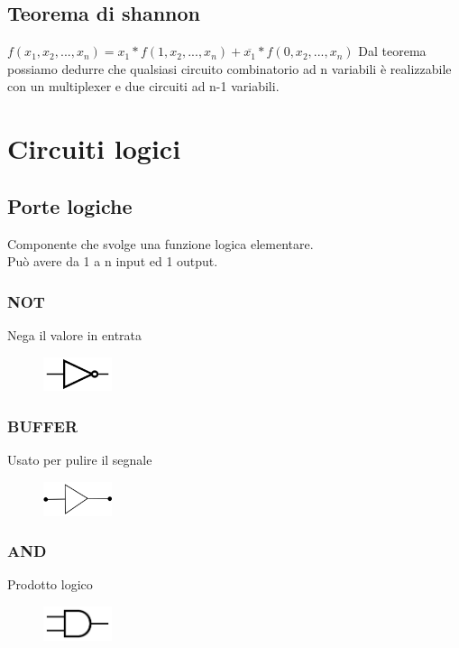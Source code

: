 \documentclass{report}
\newcommand{\n}[1]{\overline{#1}}
\begin{document}
    \subsection{Teorema di shannon}
        $f(x_1, x_2, ..., x_n) = x_1 * f(1, x_2, ..., x_n) + \n{x_1} * f(0, x_2, ..., x_n)$
        Dal teorema possiamo dedurre che qualsiasi circuito combinatorio ad n variabili 
        è realizzabile con un multiplexer e due circuiti ad n-1 variabili.            
\newpage
\section{Circuiti logici}
    \subsection{Porte logiche}
        Componente che svolge una funzione logica elementare. \\
        Può avere da 1 a n input ed 1 output. 
        \subsubsection{NOT}
        Nega il valore in entrata
        \begin{center}
            \begin{figure}[H]
                \includegraphics[width=2cm,height=1cm]{not.png}
            \end{figure}
        \end{center}
        \subsubsection{BUFFER}
            Usato per pulire il segnale
            \begin{center}
                \begin{figure}[H]
                    \includegraphics[width=2cm,height=1cm]{buffer.png}
                \end{figure}
            \end{center}
        \subsubsection{AND}
            Prodotto logico
            \begin{center}
                \begin{figure}[H]
                    \includegraphics[width=2cm,height=1cm]{and.png}
                \end{figure}
            \end{center}
\end{document}
